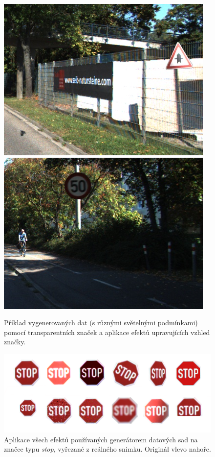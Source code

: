 \documentclass[czech]{ExcelAtFIT} %
\begin{document}
\begin{figure}[t]\centering
    \centering
    \includegraphics[width=0.49\linewidth]{images/synt_junction.png}\hfill
    \includegraphics[width=0.49\linewidth]{images/synt_50.jpg}
    \caption{Příklad vygenerovaných dat (s různými světelnými podmínkami) pomocí transparentních značek a aplikace efektů upravujících vzhled značky.}
    \label{fig:datasetTransparent}
\end{figure}

\begin{figure}[t]\centering
    \centering
    \includegraphics[width=0.99\linewidth]{images/znacky.png}
    \caption{Aplikace všech efektů používaných generátorem datových sad na značce typu \emph{stop}, vyřezané z reálného snímku. Originál vlevo nahoře.}
    \label{fig:stopImplementace}
\end{figure}

\end{document}

